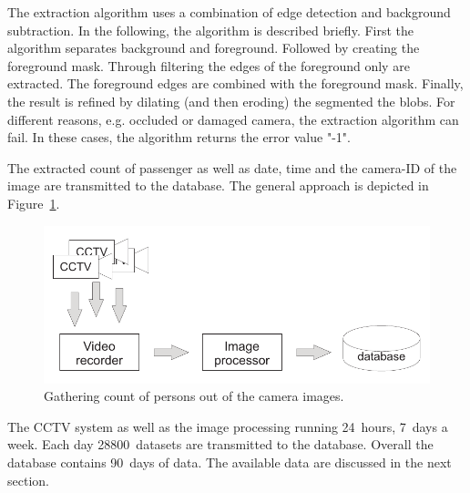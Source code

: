 The extraction algorithm uses a combination of edge detection and background subtraction. In the  following, the algorithm is described briefly.
First the algorithm separates background and foreground. Followed by creating the foreground mask.
Through filtering the edges of the foreground only are extracted. The foreground edges are combined with the foreground mask. Finally, the result is refined by dilating (and then eroding) the segmented the blobs.
For different reasons, e.g. occluded or damaged camera, the extraction algorithm can fail. In these cases, the algorithm returns the error value "-1".

The extracted count of passenger as well as date, time and the camera-ID of the image are transmitted to the database. The general approach is depicted in Figure~\ref{fig:CCTVimageProcessing}.

\begin{figure}%
  \centering
  \includegraphics[width=\linewidth]{Figures/imageProcessing.pdf} 
  \caption{Gathering count of persons out of the camera images.}
  \label{fig:CCTVimageProcessing}
\end{figure}

The CCTV system as well as the image processing running 24~hours, 7~days a week. Each day 28800~datasets are transmitted to the database. Overall the database contains 90~days of data. The available data are discussed in the next section.

